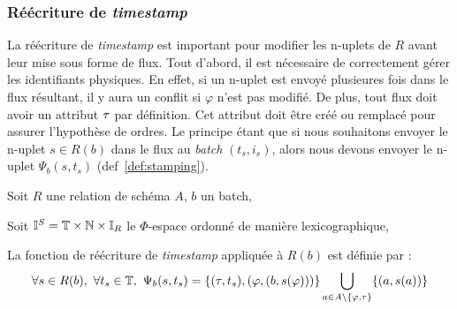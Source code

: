 \subsubsection{Réécriture de \textit{timestamp}}
La réécriture de \textit{timestamp} est important pour modifier les n-uplets de $R$ avant leur mise sous forme de flux. Tout d'abord, il est nécessaire de correctement gérer les identifiants physiques. En effet, si un n-uplet est envoyé plusieures fois dans le flux résultant, il y aura un conflit si $\varphi$ n'est pas modifié. De plus, tout flux doit avoir un attribut $\tau$ par définition. Cet attribut doit être créé ou remplacé pour assurer l'hypothèse de ordres. Le principe étant que si nous souhaitons envoyer le n-uplet $s\in R(b)$ dans le flux au \textit{batch} $(t_s,i_s)$, alors nous devons envoyer le n-uplet $\Psi_b(s,t_s)$ (def~\ref{def:stamping}).
\begin{defi}\label{def:stamping}
    Soit $R$ une relation de schéma $A$, $b$ un batch,

    Soit $\mathbb{I}^S = \mathbb{T}\times\mathbb{N}\times \mathbb{I}_R$ le $\Phi$-espace ordonné de manière lexicographique,

    La fonction de réécriture de \textit{timestamp} appliquée à $R(b)$ est définie par : 
$$\forall s\in R(b), \ \forall t_s\in\T, \ \Psi_b(s,t_s) = \{(\t,t_s), (\varphi, (b,s(\varphi)))\}\bigcup_{a\in A\backslash\{\varphi,\t\}}\{(a,s(a))\}$$
\end{defi}

